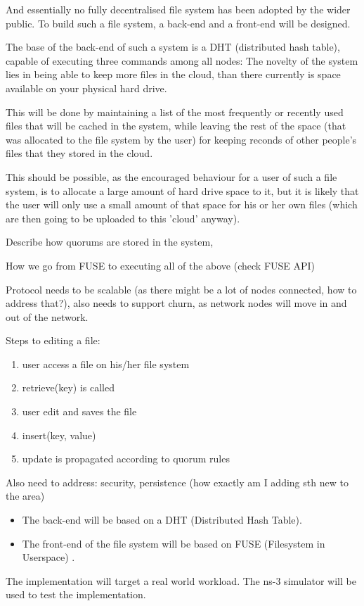 \documentclass[a4paper, 11pt]{article}
\begin{document}
And essentially no fully decentralised file system has been adopted by the wider public. 
To build such a file system, a back-end and a front-end will be designed.

The base of the back-end of such a system is a DHT (distributed hash table), capable of executing three commands among all nodes:
The novelty of the system lies in being able to keep more files in the cloud, than there currently is space available on your physical hard drive. 

This will be done by maintaining a list of the most frequently or recently used files that will be cached in the system, while leaving the rest of the space (that was allocated to the file system by the user) for keeping reconds of other people's files that they stored in the cloud.

This should be possible, as the encouraged behaviour for a user of such a file system, is to allocate a large amount of hard drive space to it, but it is likely that the user will only use a small amount of that space for his or her own files (which are then going to be uploaded to this 'cloud' anyway).

Describe how quorums are stored in the system,

How we go from FUSE to executing all of the above (check FUSE API)

Protocol needs to be scalable (as there might be a lot of nodes connected, how to address that?), also needs to support churn, as network nodes will move in and out of the network.

Steps to editing a file:
\begin{enumerate}
\item user access a file on his/her file system
\item retrieve(key) is called
\item user edit and saves the file
\item insert(key, value)
\item update is propagated according to quorum rules
\end{enumerate}

Also need to address: security, persistence (how exactly am I adding sth new to the area)
\begin{itemize}
\item The back-end will be based on a DHT (Distributed Hash Table). 
\item The front-end of the file system will be based on FUSE (Filesystem in Userspace) \cite{fuse}.
\end{itemize}
The implementation will target a real world workload. The ns-3 \cite{ns3} simulator will be used to test the implementation.
\end{document}
